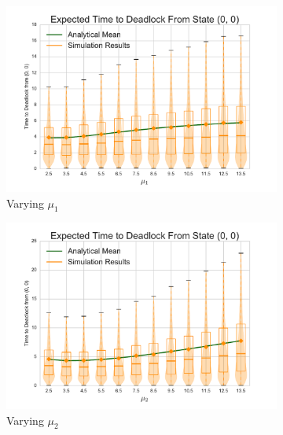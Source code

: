 \documentclass{article}
\numberwithin{equation}{section}
\begin{document}
\begin{figure}[!htbp]
\begin{center}
\begin{subfigure}[b]{0.35\textwidth}
  \label{fig:timestodeadlockfb_L2}
\end{subfigure}\\
\begin{subfigure}[b]{0.35\textwidth}
  \includegraphics[width=\textwidth]{images/vary_mu1fb}
  \caption{Varying $\mu_1$}
  \label{fig:timestodeadlockfb_mu1}
\end{subfigure}
\begin{subfigure}[b]{0.35\textwidth}
  \includegraphics[width=\textwidth]{images/vary_mu2fb}
  \caption{Varying $\mu_2$}
  \label{fig:timestodeadlockfb_mu2}
\end{subfigure}\\
\begin{subfigure}[b]{0.35\textwidth}

\end{subfigure}
\end{center}
\end{figure}
\end{document}
